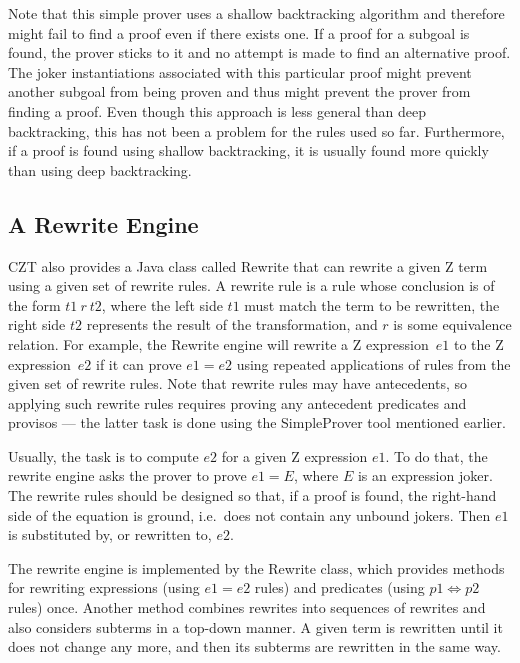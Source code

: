\documentclass{entcs}
\begin{document}
Note that this simple prover uses a shallow backtracking algorithm and
therefore might fail to find a proof even if there exists one.  If a
proof for a subgoal is found, the prover sticks to it and no attempt
is made to find an alternative proof.  The joker instantiations
associated with this particular proof might prevent another subgoal
from being proven and thus might prevent the prover from finding a
proof.  Even though this approach is less general than deep
backtracking, this has not been a problem for the rules used so far.
Furthermore, if a proof is found using shallow backtracking, it is
usually found more quickly than using deep backtracking.

\subsection{A Rewrite Engine} \label{sec:rewrite}

CZT also provides a Java class called Rewrite that can rewrite a given
Z term using a given set of rewrite rules.  A rewrite rule is a rule
whose conclusion is of the form $t1~r~t2$, where the left side $t1$
must match the term to be rewritten, the right side $t2$ represents
the result of the transformation, and $r$ is some equivalence
relation.  For example, the Rewrite engine will rewrite a Z
expression~$e1$ to the Z expression~$e2$ if it can prove $e1 = e2$
using repeated applications of rules from the given set of rewrite
rules.  Note that rewrite rules may have antecedents, so applying such
rewrite rules requires proving any antecedent predicates and provisos
--- the latter task is done using the SimpleProver tool mentioned
earlier.

Usually, the task is to compute $e2$ for a given Z expression $e1$.
To do that, the rewrite engine asks the prover to prove $e1 = E$,
where $E$ is an expression joker.  The rewrite rules should be
designed so that, if a proof is found, the right-hand side of the
equation is ground, i.e.\ does not contain any unbound jokers.  Then
$e1$ is substituted by, or rewritten to, $e2$.

The rewrite engine is implemented by the Rewrite class, which provides
methods for rewriting expressions (using $e1 = e2$ rules) and
predicates (using $p1 \iff p2$ rules) once.  Another method combines
rewrites into sequences of rewrites and also considers subterms in a
top-down manner.  A given term is rewritten until it does not change
any more, and then its subterms are rewritten in the same way.
\end{document}
